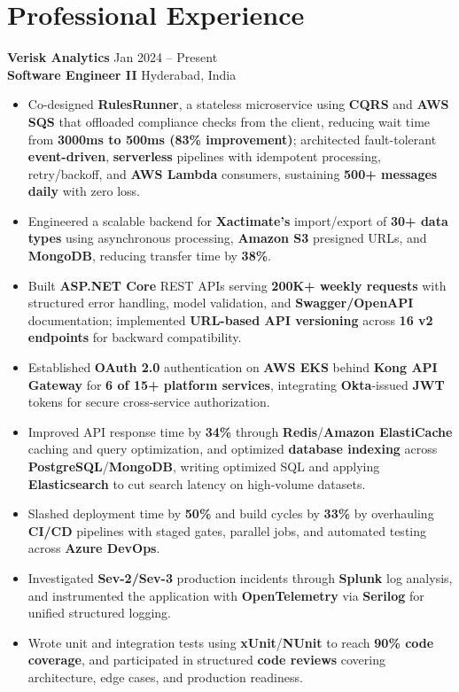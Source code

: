 \documentclass[a4paper,10pt]{article}
\begin{document}
\section*{Professional Experience}

\textbf{Verisk Analytics} \hfill Jan 2024 -- Present \\
\textbf{Software Engineer II} \hfill Hyderabad, India

\begin{itemize}[leftmargin=*]
    \item Co-designed \textbf{RulesRunner}, a stateless microservice using \textbf{CQRS} and \textbf{AWS SQS} that offloaded compliance checks from the client, reducing wait time from \textbf{3000ms to 500ms (83\% improvement)}; architected fault-tolerant \textbf{event-driven}, \textbf{serverless} pipelines with idempotent processing, retry/backoff, and \textbf{AWS Lambda} consumers, sustaining \textbf{500+ messages daily} with zero loss.
    \item Engineered a scalable backend for \textbf{Xactimate's} import/export of \textbf{30+ data types} using asynchronous processing, \textbf{Amazon S3} presigned URLs, and \textbf{MongoDB}, reducing transfer time by \textbf{38\%}.
    \item Built \textbf{ASP.NET Core} REST APIs serving \textbf{200K+ weekly requests} with structured error handling, model validation, and \textbf{Swagger/OpenAPI} documentation; implemented \textbf{URL-based API versioning} across \textbf{16 v2 endpoints} for backward compatibility.
    \item Established \textbf{OAuth 2.0} authentication on \textbf{AWS EKS} behind \textbf{Kong API Gateway} for \textbf{6 of 15+ platform services}, integrating \textbf{Okta}-issued \textbf{JWT} tokens for secure cross-service authorization.
    \item Improved API response time by \textbf{34\%} through \textbf{Redis}/\textbf{Amazon ElastiCache} caching and query optimization, and optimized \textbf{database indexing} across \textbf{PostgreSQL}/\textbf{MongoDB}, writing optimized SQL and applying \textbf{Elasticsearch} to cut search latency on high-volume datasets.
    \item Slashed deployment time by \textbf{50\%} and build cycles by \textbf{33\%} by overhauling \textbf{CI/CD} pipelines with staged gates, parallel jobs, and automated testing across \textbf{Azure DevOps}.
    \item Investigated \textbf{Sev-2/Sev-3} production incidents through \textbf{Splunk} log analysis, and instrumented the application with \textbf{OpenTelemetry} via \textbf{Serilog} for unified structured logging.
    \item Wrote unit and integration tests using \textbf{xUnit}/\textbf{NUnit} to reach \textbf{90\% code coverage}, and participated in structured \textbf{code reviews} covering architecture, edge cases, and production readiness.
\end{itemize}
\end{document}
